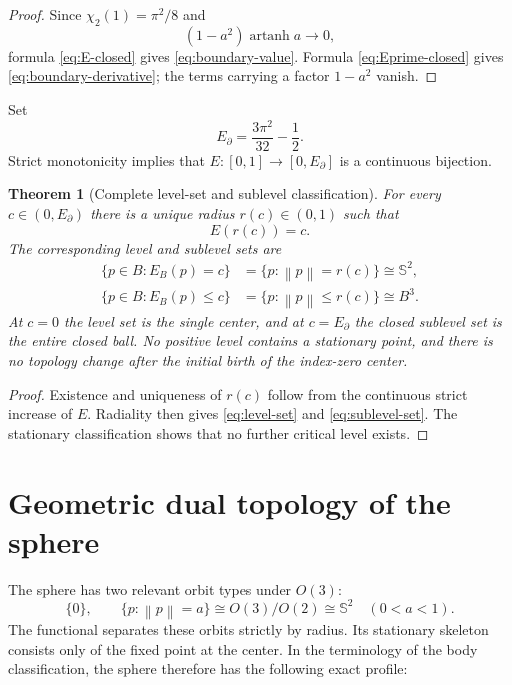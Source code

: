 \documentclass[11pt]{article}
\newtheorem{theorem}{Theorem}[section]
\theoremstyle{definition}
\newcommand{\Sph}{\mathbb{S}}
\newcommand{\atanh}{\operatorname{artanh}}
\newcommand{\norm}[1]{\left\lVert #1\right\rVert}
\begin{document}
\begin{proof}
Since $\chi_2(1)=\pi^2/8$ and
\[
(1-a^2)\atanh a\longrightarrow0,
\]
formula \eqref{eq:E-closed} gives \eqref{eq:boundary-value}.  Formula \eqref{eq:Eprime-closed} gives \eqref{eq:boundary-derivative}; the terms carrying a factor $1-a^2$ vanish.
\end{proof}

Set
\begin{equation}
E_\partial=\frac{3\pi^2}{32}-\frac12.
\label{eq:Eboundary}
\end{equation}
Strict monotonicity implies that $E:[0,1]\to[0,E_\partial]$ is a continuous bijection.

\begin{theorem}[Complete level-set and sublevel classification]
For every $c\in(0,E_\partial)$ there is a unique radius $r(c)\in(0,1)$ such that
\[
E(r(c))=c.
\]
The corresponding level and sublevel sets are
\begin{align}
\{p\in B:E_B(p)=c\}&=\{p:\norm p=r(c)\}\cong\Sph^2,
\label{eq:level-set}\\
\{p\in B:E_B(p)\leq c\}&=\{p:\norm p\leq r(c)\}\cong B^3.
\label{eq:sublevel-set}
\end{align}
At $c=0$ the level set is the single center, and at $c=E_\partial$ the closed sublevel set is the entire closed ball.  No positive level contains a stationary point, and there is no topology change after the initial birth of the index-zero center.
\end{theorem}

\begin{proof}
Existence and uniqueness of $r(c)$ follow from the continuous strict increase of $E$.  Radiality then gives \eqref{eq:level-set} and \eqref{eq:sublevel-set}.  The stationary classification shows that no further critical level exists.
\end{proof}

\section{Geometric dual topology of the sphere}

The sphere has two relevant orbit types under $O(3)$:
\[
\{0\},
\qquad
\{p:\norm p=a\}\cong O(3)/O(2)\cong\Sph^2
\quad(0<a<1).
\]
The functional separates these orbits strictly by radius.  Its stationary skeleton consists only of the fixed point at the center.  In the terminology of the body classification, the sphere therefore has the following exact profile:
\end{document}
